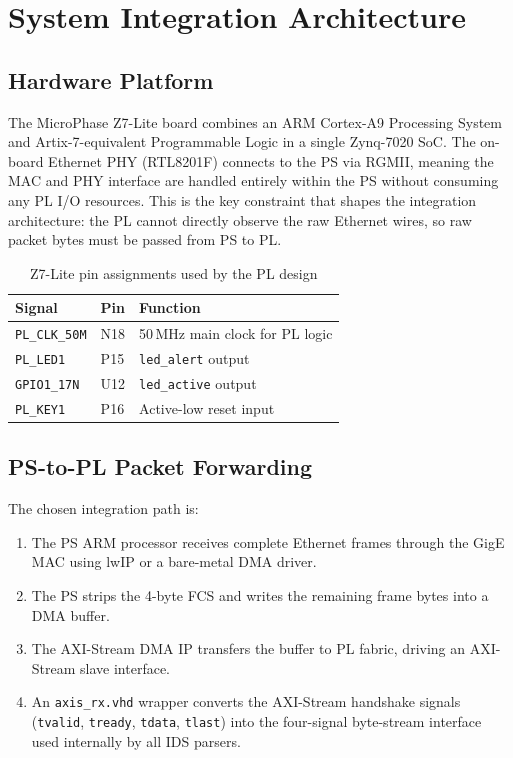\documentclass[12pt, a4paper]{report}
\begin{document}
\chapter{System Integration Architecture}
\label{ch:integration}

\section{Hardware Platform}

The MicroPhase Z7-Lite board combines an ARM Cortex-A9 Processing System and Artix-7-equivalent Programmable Logic in a single Zynq-7020 SoC. The on-board Ethernet PHY (RTL8201F) connects to the PS via RGMII, meaning the MAC and PHY interface are handled entirely within the PS without consuming any PL I/O resources. This is the key constraint that shapes the integration architecture: the PL cannot directly observe the raw Ethernet wires, so raw packet bytes must be passed from PS to PL.

\begin{table}[H]
\centering
\caption{Z7-Lite pin assignments used by the PL design}
\label{tab:pins}
\begin{tabular}{lll}
\toprule
\textbf{Signal} & \textbf{Pin} & \textbf{Function} \\
\midrule
\texttt{PL\_CLK\_50M} & N18 & 50\,MHz main clock for PL logic \\
\texttt{PL\_LED1}     & P15 & \texttt{led\_alert} output       \\
\texttt{GPIO1\_17N}   & U12 & \texttt{led\_active} output      \\
\texttt{PL\_KEY1}     & P16 & Active-low reset input           \\
\bottomrule
\end{tabular}
\end{table}

\section{PS-to-PL Packet Forwarding}

The chosen integration path is:

\begin{enumerate}
    \item The PS ARM processor receives complete Ethernet frames through the GigE MAC using lwIP or a bare-metal DMA driver.
    \item The PS strips the 4-byte FCS and writes the remaining frame bytes into a DMA buffer.
    \item The AXI-Stream DMA IP transfers the buffer to PL fabric, driving an AXI-Stream slave interface.
    \item An \texttt{axis\_rx.vhd} wrapper converts the AXI-Stream handshake signals (\texttt{tvalid}, \texttt{tready}, \texttt{tdata}, \texttt{tlast}) into the four-signal byte-stream interface used internally by all IDS parsers.
\end{enumerate}
\end{document}
